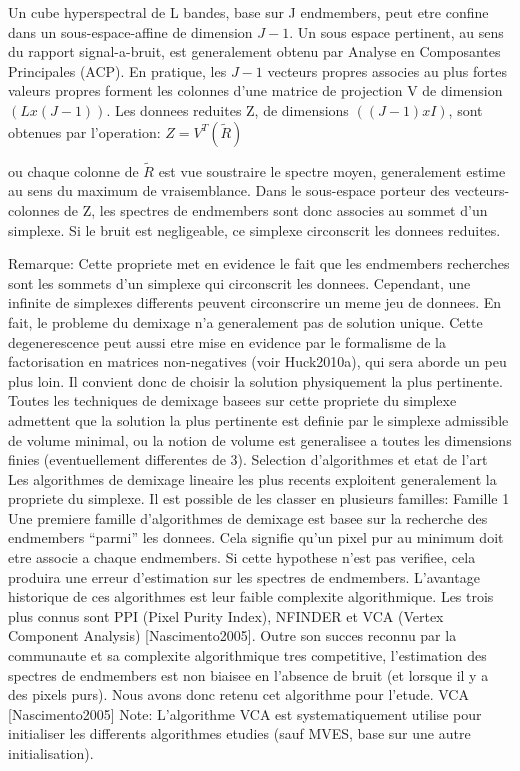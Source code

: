 Un cube hyperspectral de L bandes, base sur J endmembers,
peut etre confine dans un sous-espace-affine de dimension $J-1$.  
Un sous espace pertinent, au sens du rapport signal-a-bruit, est
generalement obtenu par Analyse en Composantes Principales (ACP). En
pratique, les $J-1$ vecteurs propres associes au plus fortes valeurs
propres forment les colonnes d'une matrice de projection V de
dimension $(Lx(J-1))$. Les donnees reduites Z, de dimensions
$((J-1)xI)$, sont obtenues par l'operation:
$Z=V^{T}(\tilde{R})$

ou chaque colonne de $\tilde{R}$ est vue soustraire le spectre moyen,
generalement estime au sens du maximum de vraisemblance. Dans le
sous-espace porteur des vecteurs-colonnes de Z, les spectres de
endmembers sont donc associes au sommet d'un simplexe. Si le bruit est
negligeable, ce simplexe circonscrit les donnees reduites.

Remarque: Cette propriete met en evidence le fait que les endmembers
recherches sont les sommets d'un simplexe qui circonscrit les
donnees. Cependant, une infinite de simplexes differents peuvent
circonscrire un meme jeu de donnees. En fait, le probleme du demixage
n'a generalement pas de solution unique. Cette degenerescence peut
aussi etre mise en evidence par le formalisme de la factorisation en
matrices non-negatives (voir Huck2010a), qui sera aborde un peu plus
loin. Il convient donc de choisir la solution physiquement la plus
pertinente. Toutes les techniques de demixage basees sur cette
propriete du simplexe admettent que la solution la plus pertinente est
definie par le simplexe admissible de volume minimal, ou la notion de
volume est generalisee a toutes les dimensions finies (eventuellement
differentes de 3).  Selection d'algorithmes et etat de l'art Les
algorithmes de demixage lineaire les plus recents exploitent
generalement la propriete du simplexe. Il est possible de les classer
en plusieurs familles: 
Famille 1 Une premiere famille d'algorithmes
de demixage est basee sur la recherche des endmembers ``parmi'' les
donnees. Cela signifie qu'un pixel pur au minimum doit etre associe a
chaque endmembers. Si cette hypothese n'est pas verifiee, cela
produira une erreur d'estimation sur les spectres de
endmembers. L'avantage historique de ces algorithmes est leur faible
complexite algorithmique. Les trois plus connus sont PPI (Pixel Purity
Index), NFINDER et VCA (Vertex Component Analysis)
[Nascimento2005]. Outre son succes reconnu par la communaute et sa
complexite algorithmique tres competitive, l'estimation des spectres
de endmembers est non biaisee en l'absence de bruit (et lorsque il y a
des pixels purs). Nous avons donc retenu cet algorithme pour l'etude.
VCA [Nascimento2005] 
Note: L'algorithme VCA est systematiquement
utilise pour initialiser les differents algorithmes etudies (sauf
MVES, base sur une autre initialisation).

